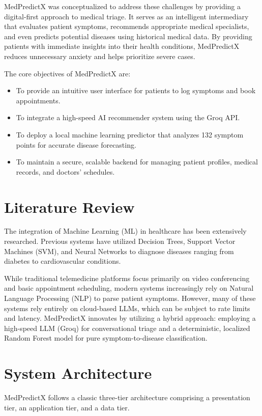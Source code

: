 \documentclass[conference]{IEEEtran}
\begin{document}
MedPredictX was conceptualized to address these challenges by providing a digital-first approach to medical triage. It serves as an intelligent intermediary that evaluates patient symptoms, recommends appropriate medical specialists, and even predicts potential diseases using historical medical data. By providing patients with immediate insights into their health conditions, MedPredictX reduces unnecessary anxiety and helps prioritize severe cases.

The core objectives of MedPredictX are:
\begin{itemize}
    \item To provide an intuitive user interface for patients to log symptoms and book appointments.
    \item To integrate a high-speed AI recommender system using the Groq API.
    \item To deploy a local machine learning predictor that analyzes 132 symptom points for accurate disease forecasting.
    \item To maintain a secure, scalable backend for managing patient profiles, medical records, and doctors' schedules.
\end{itemize}

\section{Literature Review}
The integration of Machine Learning (ML) in healthcare has been extensively researched. Previous systems have utilized Decision Trees, Support Vector Machines (SVM), and Neural Networks to diagnose diseases ranging from diabetes to cardiovascular conditions.

While traditional telemedicine platforms focus primarily on video conferencing and basic appointment scheduling, modern systems increasingly rely on Natural Language Processing (NLP) to parse patient symptoms. However, many of these systems rely entirely on cloud-based LLMs, which can be subject to rate limits and latency. MedPredictX innovates by utilizing a hybrid approach: employing a high-speed LLM (Groq) for conversational triage and a deterministic, localized Random Forest model for pure symptom-to-disease classification.

\section{System Architecture}
MedPredictX follows a classic three-tier architecture comprising a presentation tier, an application tier, and a data tier. 
\end{document}

